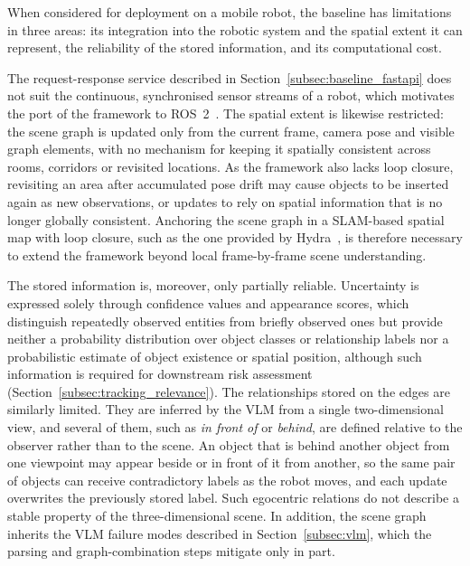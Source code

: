 {{{\small When considered for deployment on a mobile robot, the baseline has limitations in three areas: its integration into the robotic system and the spatial extent it can represent, the reliability of the stored information, and its computational cost.\par}

{\small The request-response service described in Section~\ref{subsec:baseline_fastapi} does not suit the continuous, synchronised sensor streams of a robot, which motivates the port of the framework to ROS~2~\cite{macenski2022ros2}. The spatial extent is likewise restricted: the scene graph is updated only from the current frame, camera pose and visible graph elements, with no mechanism for keeping it spatially consistent across rooms, corridors or revisited locations. As the framework also lacks loop closure, revisiting an area after accumulated pose drift may cause objects to be inserted again as new observations, or updates to rely on spatial information that is no longer globally consistent. Anchoring the scene graph in a SLAM-based spatial map with loop closure, such as the one provided by Hydra~\cite{hughes2022hydra}, is therefore necessary to extend the framework beyond local frame-by-frame scene understanding.\par}

{\small The stored information is, moreover, only partially reliable. Uncertainty is expressed solely through confidence values and appearance scores, which distinguish repeatedly observed entities from briefly observed ones but provide neither a probability distribution over object classes or relationship labels nor a probabilistic estimate of object existence or spatial position, although such information is required for downstream risk assessment (Section~\ref{subsec:tracking_relevance}). The relationships stored on the edges are similarly limited. They are inferred by the VLM from a single two-dimensional view, and several of them, such as \textit{in front of} or \textit{behind}, are defined relative to the observer rather than to the scene. An object that is behind another object from one viewpoint may appear beside or in front of it from another, so the same pair of objects can receive contradictory labels as the robot moves, and each update overwrites the previously stored label. Such egocentric relations do not describe a stable property of the three-dimensional scene. In addition, the scene graph inherits the VLM failure modes described in Section~\ref{subsec:vlm}, which the parsing and graph-combination steps mitigate only in part.\par}

}}
